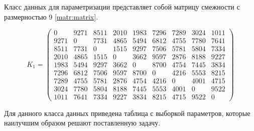 \clearpage

Класс данных для параметризации представляет собой матрицу смежности с размерностью 9 \ref{matr:matrix}.

\begin{equation}
    \label{matr:matrix}
	K_{1} = \begin{pmatrix}
		0 & 9271 & 8511 & 2010 & 1983 & 7296 & 7289 & 3024 & 1011 \\
        9271 & 0 & 7731 & 4865 & 5494 & 6812 & 4755 & 7780 & 7641 \\
        8511 & 7731 & 0 & 1515 & 9297 & 7506 & 5781 & 5804 & 7334 \\
        2010 & 4865 & 1515 & 0 & 3662 & 9597 & 2876 & 8188 & 9227 \\
        1983 & 5494 & 9297 & 3662 & 0 & 8700 & 4754 & 7445 & 3834 \\
        7296 & 6812 & 7506 & 9597 & 8700 & 0 & 4216 & 5553 & 8215 \\
        7289 & 4755 & 5781 & 2876 & 4754 & 4216 & 0 & 4001 & 4715 \\
        3024 & 7780 & 5804 & 8188 & 7445 & 5553 & 4001 & 0 & 9522 \\
        1011 & 7641 & 7334 & 9227 & 3834 & 8215 & 4715 & 9522 & 0 
	\end{pmatrix}
\end{equation}

Для данного класса данных приведена таблица с выборкой 
параметров, которые наилучшим образом решают поставленную задачу.

